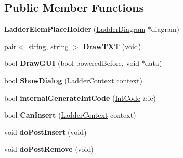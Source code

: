 \subsection*{Public Member Functions}
\begin{DoxyCompactItemize}
\item 
\hypertarget{class_ladder_elem_place_holder_ad773e6b5f7972c99558e3e8e74865854}{{\bfseries Ladder\-Elem\-Place\-Holder} (\hyperlink{class_ladder_diagram}{Ladder\-Diagram} $\ast$diagram)}\label{class_ladder_elem_place_holder_ad773e6b5f7972c99558e3e8e74865854}

\item 
\hypertarget{class_ladder_elem_place_holder_a4f49c1b51a99ddfe87b366a7952ec612}{pair$<$ string, string $>$ {\bfseries Draw\-T\-X\-T} (void)}\label{class_ladder_elem_place_holder_a4f49c1b51a99ddfe87b366a7952ec612}

\item 
\hypertarget{class_ladder_elem_place_holder_a779355f5b9328a194ebfa1e24d146ca7}{bool {\bfseries Draw\-G\-U\-I} (bool powered\-Before, void $\ast$data)}\label{class_ladder_elem_place_holder_a779355f5b9328a194ebfa1e24d146ca7}

\item 
\hypertarget{class_ladder_elem_place_holder_a4e14be597ec206b0b4fafb3046aa6f41}{bool {\bfseries Show\-Dialog} (\hyperlink{struct_ladder_context}{Ladder\-Context} context)}\label{class_ladder_elem_place_holder_a4e14be597ec206b0b4fafb3046aa6f41}

\item 
\hypertarget{class_ladder_elem_place_holder_a0cd8af548fc92f7f474863ba01cd36ed}{bool {\bfseries internal\-Generate\-Int\-Code} (\hyperlink{class_int_code}{Int\-Code} \&ic)}\label{class_ladder_elem_place_holder_a0cd8af548fc92f7f474863ba01cd36ed}

\item 
\hypertarget{class_ladder_elem_place_holder_ac5a433c837dcc6c59cc3ab60b318ac1c}{bool {\bfseries Can\-Insert} (\hyperlink{struct_ladder_context}{Ladder\-Context} context)}\label{class_ladder_elem_place_holder_ac5a433c837dcc6c59cc3ab60b318ac1c}

\item 
\hypertarget{class_ladder_elem_place_holder_aedff5783683d8700f36339c8e012224e}{void {\bfseries do\-Post\-Insert} (void)}\label{class_ladder_elem_place_holder_aedff5783683d8700f36339c8e012224e}

\item 
\hypertarget{class_ladder_elem_place_holder_aca181ad5a4e326b8fb3639d968b8329d}{void {\bfseries do\-Post\-Remove} (void)}\label{class_ladder_elem_place_holder_aca181ad5a4e326b8fb3639d968b8329d}


\end{DoxyCompactItemize}
